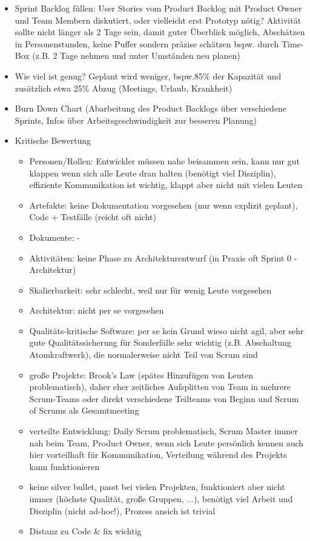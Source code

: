 \documentclass[paper=a4, fontsize=11pt]{scrartcl} %
\numberwithin{equation}{section} %
\numberwithin{figure}{section} %
\numberwithin{table}{section} %
\begin{document}
\begin{itemize}
\begin{itemize}
    \item Sprint Backlog füllen: User Stories vom Product Backlog mit Product Owner und Team Membern diskutiert, oder vielleicht erst Prototyp nötig? Aktivität sollte nicht länger als 2 Tage sein, damit guter Überblick möglich, Abschätzen in Personenstunden, keine Puffer sondern präzise schätzen bspw. durch Time-Box (z.B. 2 Tage nehmen und unter Umständen neu planen)
    \item Wie viel ist genug? Geplant wird weniger, bspw.85\% der Kapazität und zusätzlich etwa 25\% Abzug (Meetings, Urlaub, Krankheit)
    \item Burn Down Chart (Abarbeitung des Product Backlogs über verschiedene Sprints, Infos über Arbeitsgeschwindigkeit zur besseren Planung)
    \item Kritische Bewertung
    \begin{itemize}
      \item Personen/Rollen: Entwickler müssen nahe beisammen sein, kann nur gut klappen wenn sich alle Leute dran halten (benötigt viel Disziplin), effiziente Kommunikation ist wichtig, klappt aber nicht mit vielen Leuten
      \item Artefakte: keine Dokumentation vorgesehen (nur wenn explizit geplant), Code + Testfälle (reicht oft nicht)
      \item Dokumente: -
      \item Aktivitäten: keine Phase zu Architekturentwurf (in Praxis oft Sprint 0 - Architektur)
      \item Skalierbarkeit: sehr schlecht, weil nur für wenig Leute vorgesehen
      \item Architektur: nicht per se vorgesehen
      \item Qualitäts-kritische Software: per se kein Grund wieso nicht agil, aber sehr gute Qualitätssicherung für Sonderfälle sehr wichtig (z.B. Abschaltung Atomkraftwerk), die normalerweise nicht Teil von Scrum sind
      \item große Projekte: Brook's Law (spätes Hinzufügen von Leuten problematisch), daher eher zeitliches Aufsplitten von Team in mehrere Scrum-Teams oder direkt verschiedene Teilteams von Beginn und Scrum of Scrums als Gesamtmeeting
      \item verteilte Entwicklung: Daily Scrum problematisch, Scrum Master immer nah beim Team, Product Owner, wenn sich Leute persönlich kennen auch hier vorteilhaft für Kommunikation, Verteilung während des Projekts kann funktionieren
      \item keine silver bullet, passt bei vielen Projekten, funktioniert aber nicht immer (höchste Qualität, große Gruppen, ...), benötigt viel Arbeit und Disziplin (nicht ad-hoc!), Prozess ansich ist trivial
      \item Distanz zu Code \& fix wichtig
    \end{itemize}
  \end{itemize}
\end{itemize}
\end{document}
